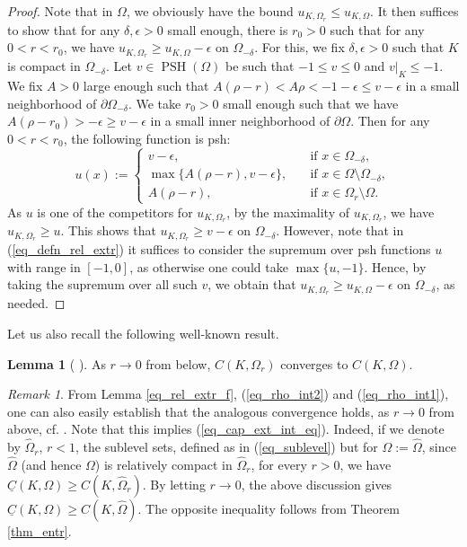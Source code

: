 \documentclass[12pt]{article}
\numberwithin{equation}{section}
\theoremstyle{theorem}
\theoremstyle{definition}
\newtheorem{lem}[thm]{Lemma}
\theoremstyle{remark}
\newtheorem{rem}[thm]{Remark}
\newcommand{\psh}{\operatorname{PSH}}
\begin{document}
	\begin{proof}
		Note that in $\Omega$, we obviously have the bound $u_{K, \Omega_r} \leq u_{K, \Omega}$.
		It then suffices to show that for any $\delta, \epsilon > 0$ small enough, there is $r_0 > 0$ such that for any $0 < r < r_0$, we have $u_{K, \Omega_r} \geq u_{K, \Omega} - \epsilon$ on $\Omega_{-\delta}$.
		For this, we fix $\delta, \epsilon > 0$ such that $K$ is compact in $\Omega_{-\delta}$.
		Let $v \in \psh(\Omega)$ be such that $-1 \leq v \leq 0$ and $v|_K \leq -1$.
		We fix $A > 0$ large enough such that $A (\rho - r) < A \rho < -1 - \epsilon \leq v - \epsilon$ in a small neighborhood of $\partial \Omega_{-\delta}$.
		We take $r_0 > 0$ small enough such that we have $A (\rho - r_0) >  - \epsilon \geq v - \epsilon$ in a small inner neighborhood of $\partial \Omega$.
		Then for any $0 < r < r_0$, the following function is psh:
		\begin{equation}\label{eq_u_cnt_ur}
			u(x) 
			:=
			\begin{cases}
				v - \epsilon, \quad &\text{if } x \in \Omega_{-\delta},
				\\
				\max \big\{ A (\rho - r),  v - \epsilon \big\}, \quad &\text{if } x \in \Omega \setminus \Omega_{-\delta},
				\\
				A(\rho - r), \quad &\text{if } x \in \Omega_r \setminus \Omega.
			\end{cases} 
		\end{equation}
		As $u$ is one of the competitors for $u_{K, \Omega_r}$, by the maximality of $u_{K, \Omega_r}$, we have $u_{K, \Omega_r} \geq u$. 
		This shows that $u_{K, \Omega_r} \geq v - \epsilon$ on $\Omega_{-\delta}$. 
		However, note that in (\ref{eq_defn_rel_extr}) it suffices to consider the supremum over psh functions $u$ with range in $[-1, 0]$, as otherwise one could take $\max \{ u, -1 \}$.
		Hence, by taking the supremum over all such $v$, we obtain that $u_{K, \Omega_r} \geq u_{K, \Omega} - \epsilon$ on $\Omega_{-\delta}$, as needed.
	\end{proof}
	Let us also recall the following well-known result.
	\begin{lem}[ {\cite[Proposition 4.5.7]{KlimekBook}} ]\label{lem_cap_reg}
		As $r \to 0$ from below, $C(K, \Omega_r)$ converges to $C(K, \Omega)$.
	\end{lem}
	\begin{rem}\label{rem_c_above_cont}
		From Lemma \ref{eq_rel_extr_f}, (\ref{eq_rho_int2}) and (\ref{eq_rho_int1}), one can also easily establish that the analogous convergence holds, as $r \to 0$ from above, cf. \cite[Lemma 2.15]{BandNivoc}.
		Note that this implies (\ref{eq_cap_ext_int_eq}). 
		Indeed, if we denote by $\widehat{\Omega}_r$, $r < 1$, the sublevel sets, defined as in (\ref{eq_sublevel}) but for $\Omega := \widehat{\Omega}$, since $\widehat{\Omega}$ (and hence $\Omega$) is relatively compact in $\widehat{\Omega}_r$, for every $r > 0$, we have $\underline{C}(K, \Omega) \geq C(K, \widehat{\Omega}_r)$. 
		By letting $r \to 0$, the above discussion gives $\underline{C}(K, \Omega) \geq C(K, \widehat{\Omega})$.
		The opposite inequality follows from Theorem \ref{thm_entr}.
	\end{rem}
\end{document}
